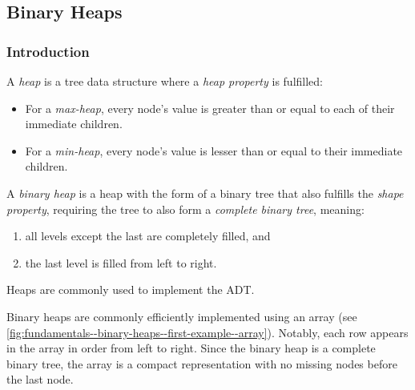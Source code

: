 \subsection{Binary Heaps}%
\label{sub:fundamentals--binary-heaps}

\subsubsection{Introduction}

A \emph{heap} is a tree data structure where a \emph{heap property} is fulfilled:
\begin{itemize}
    \item For a \emph{max-heap}, every node's value is greater than or equal to each of their immediate children.
    \item For a \emph{min-heap}, every node's value is lesser than or equal to their immediate children.
\end{itemize}

A \emph{binary heap} is a heap with the form of a binary tree that also fulfills the \emph{shape property}, requiring the tree to also form a \emph{complete binary tree}, meaning:
\begin{enumerate}
    \item all levels except the last are completely filled, and
    \item the last level is filled from left to right.
\end{enumerate}

Heaps are commonly used to implement the  ADT.

Binary heaps are commonly efficiently implemented using an array (see \cref{fig:fundamentals--binary-heaps--first-example--array}). Notably, each row appears in the array in order from left to right. Since the binary heap is a complete binary tree, the array is a compact representation with no missing nodes before the last node.

